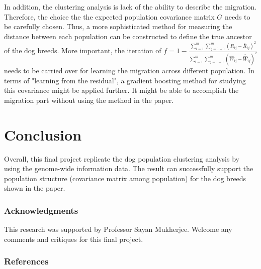 \documentclass{article} %
\begin{document}
In addition, the clustering analysis is lack of the ability to describe the migration. Therefore, the choice the the expected population covariance matrix $G$ needs to be carefully chosen. Thus, a more sophisticated method for measuring the distance between each population can be constructed to define the true ancestor of the dog breeds. More important, the iteration of $f=1-\frac{\sum_{i=1}^m \sum_{j=1+1}^m (R_{ij}-\bar{R}_{ij})^2}{\sum_{i=1}^m \sum_{j=1+1}^m (\hat{W}_{ij}-\bar{\hat{W}}_{ij})^2}$ needs to be carried over for learning the migration across different population. In terms of "learning from the residual", a gradient boosting method for studying this covariance might be applied further. It might be able to accomplish the migration part without using the method in the paper.

\section{Conclusion}

Overall, this final project replicate the dog population clustering analysis by using the genome-wide information data. The result can successfully support the population structure (covariance matrix among population) for the dog breeds shown in the paper. 

\newpage

\subsubsection*{Acknowledgments}

This research was supported by Professor Sayan Mukherjee. Welcome any comments and critiques for this final project.

\subsubsection*{References}
\end{document}
